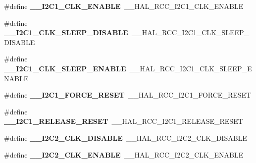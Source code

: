 \begin{DoxyCompactItemize}
\item 
\mbox{\label{group___h_a_l___r_c_c___aliased_ga57473cd6a4f76fedbac6dae08c8c6e78}} 
\#define {\bfseries \+\_\+\+\_\+\+I2\+C1\+\_\+\+C\+L\+K\+\_\+\+E\+N\+A\+B\+LE}~\+\_\+\+\_\+\+H\+A\+L\+\_\+\+R\+C\+C\+\_\+\+I2\+C1\+\_\+\+C\+L\+K\+\_\+\+E\+N\+A\+B\+LE
\item 
\mbox{\label{group___h_a_l___r_c_c___aliased_ga7bbdc41f3b1b13f8fe2a9c090050ed7f}} 
\#define {\bfseries \+\_\+\+\_\+\+I2\+C1\+\_\+\+C\+L\+K\+\_\+\+S\+L\+E\+E\+P\+\_\+\+D\+I\+S\+A\+B\+LE}~\+\_\+\+\_\+\+H\+A\+L\+\_\+\+R\+C\+C\+\_\+\+I2\+C1\+\_\+\+C\+L\+K\+\_\+\+S\+L\+E\+E\+P\+\_\+\+D\+I\+S\+A\+B\+LE
\item 
\mbox{\label{group___h_a_l___r_c_c___aliased_gae34832665142d53a98bf833c9f9558b8}} 
\#define {\bfseries \+\_\+\+\_\+\+I2\+C1\+\_\+\+C\+L\+K\+\_\+\+S\+L\+E\+E\+P\+\_\+\+E\+N\+A\+B\+LE}~\+\_\+\+\_\+\+H\+A\+L\+\_\+\+R\+C\+C\+\_\+\+I2\+C1\+\_\+\+C\+L\+K\+\_\+\+S\+L\+E\+E\+P\+\_\+\+E\+N\+A\+B\+LE
\item 
\mbox{\label{group___h_a_l___r_c_c___aliased_gae84da6d623ad78feba69961ea4f776bf}} 
\#define {\bfseries \+\_\+\+\_\+\+I2\+C1\+\_\+\+F\+O\+R\+C\+E\+\_\+\+R\+E\+S\+ET}~\+\_\+\+\_\+\+H\+A\+L\+\_\+\+R\+C\+C\+\_\+\+I2\+C1\+\_\+\+F\+O\+R\+C\+E\+\_\+\+R\+E\+S\+ET
\item 
\mbox{\label{group___h_a_l___r_c_c___aliased_gae58af756d3706dcb17376b4674e70ed8}} 
\#define {\bfseries \+\_\+\+\_\+\+I2\+C1\+\_\+\+R\+E\+L\+E\+A\+S\+E\+\_\+\+R\+E\+S\+ET}~\+\_\+\+\_\+\+H\+A\+L\+\_\+\+R\+C\+C\+\_\+\+I2\+C1\+\_\+\+R\+E\+L\+E\+A\+S\+E\+\_\+\+R\+E\+S\+ET
\item 
\mbox{\label{group___h_a_l___r_c_c___aliased_ga4035dd0ee6f7b6386fd8531181786c97}} 
\#define {\bfseries \+\_\+\+\_\+\+I2\+C2\+\_\+\+C\+L\+K\+\_\+\+D\+I\+S\+A\+B\+LE}~\+\_\+\+\_\+\+H\+A\+L\+\_\+\+R\+C\+C\+\_\+\+I2\+C2\+\_\+\+C\+L\+K\+\_\+\+D\+I\+S\+A\+B\+LE
\item 
\mbox{\label{group___h_a_l___r_c_c___aliased_ga5cef079b7e35da960f9871a7d1ed1816}} 
\#define {\bfseries \+\_\+\+\_\+\+I2\+C2\+\_\+\+C\+L\+K\+\_\+\+E\+N\+A\+B\+LE}~\+\_\+\+\_\+\+H\+A\+L\+\_\+\+R\+C\+C\+\_\+\+I2\+C2\+\_\+\+C\+L\+K\+\_\+\+E\+N\+A\+B\+LE

\end{DoxyCompactItemize}
